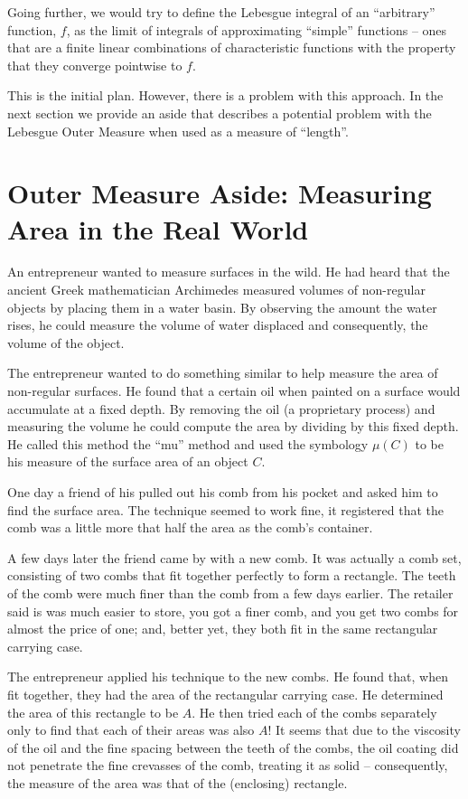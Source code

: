 \documentclass{article}
\begin{document}
Going further, we would try to define the Lebesgue integral of an ``arbitrary''
function, $f$, as the limit of integrals of approximating ``simple'' 
functions  -- ones that are a finite linear combinations of characteristic 
functions with the property that they converge pointwise to $f$.

This is the initial plan. However, there is a problem with this approach. 
In the next section we provide an aside that describes a potential problem 
with the Lebesgue Outer Measure when used as a measure of ``length''.

\section{Outer Measure Aside: Measuring Area in the Real World}
An entrepreneur 
wanted to measure surfaces in the wild. He had heard that the 
ancient Greek mathematician Archimedes measured volumes of non-regular objects 
by placing them in a water basin. By observing the amount the water rises, he 
could measure the volume of water displaced and consequently, the volume of the object.

The entrepreneur wanted to do something similar to help measure the area of 
non-regular surfaces. He found that a 
certain oil when painted on a surface would accumulate at a fixed depth. By 
removing the oil (a proprietary process) and measuring the volume he could 
compute the area by dividing by this fixed depth. He called this method the 
``mu'' method and used the symbology $\mu(C)$ to be his measure of the surface 
area of an object $C$.

One day a friend of his pulled out his comb from his pocket and asked him to 
find the surface area. The technique seemed to work fine, it registered that 
the comb was a little more that half the area as the comb's container.

A few days later the friend came by with a new comb. It was actually a comb 
set, consisting of two combs that fit together perfectly to form a rectangle.
The teeth of the comb were much finer than the comb from a few days earlier. 
The retailer said is was much easier to store, you got a finer comb, and you 
get two combs for almost the price of one; and, better yet, they both 
fit in the same rectangular carrying case.

The entrepreneur applied his technique to the new combs. 
He found that, when fit together, they had the area of the rectangular carrying case.
He determined the area of this rectangle to be $A$. He then tried each of the 
combs separately only to find that each of their areas was also $A$!
It seems that due to the viscosity of the oil and the fine spacing between the 
teeth of the combs, the oil coating did not penetrate the fine crevasses of the 
comb, treating it as solid -- consequently, the measure of the area was 
that of the (enclosing) rectangle.
\end{document}
